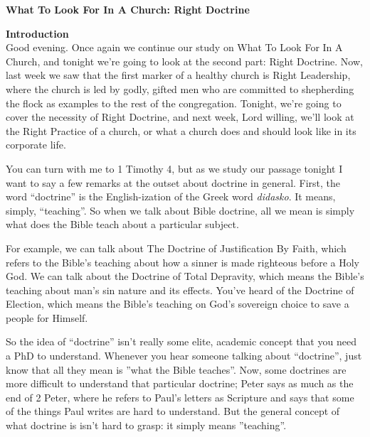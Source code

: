 \documentclass[letterpaper, 12pt]{article}
\begin{document}
    \thispagestyle{empty}

    \begin{center}

        \textbf{\large{What To Look For In A Church: Right Doctrine}}

    \end{center}

    \noindent \textbf{Introduction} \\

    Good evening. Once again we continue our study on What To Look For
    In A Church, and tonight we're going to look at the second part:
    Right Doctrine. Now, last week we saw that the first marker of a
    healthy church is Right Leadership, where the church is led by
    godly, gifted men who are committed to shepherding the flock as
    examples to the rest of the congregation. Tonight, we're going to
    cover the necessity of Right Doctrine, and next week, Lord willing,
    we'll look at the Right Practice of a church, or what a church does
    and should look like in its corporate life.

    You can turn with me to 1 Timothy 4, but as we study our passage
    tonight I want to say a few remarks at the outset about doctrine in
    general. First, the word ``doctrine'' is the English-ization of the
    Greek word \emph{didasko}. It means, simply, ``teaching''. So when
    we talk about Bible doctrine, all we mean is simply what does the
    Bible teach about a particular subject.

    For example, we can talk about The Doctrine of Justification By
    Faith, which refers to the Bible's teaching about how a sinner is
    made righteous before a Holy God. We can talk about the Doctrine of
    Total Depravity, which means the Bible's teaching about man's sin
    nature and its effects. You've heard of the Doctrine of Election,
    which means the Bible's teaching on God's sovereign choice to save a
    people for Himself.

    So the idea of ``doctrine'' isn't really some elite, academic
    concept that you need a PhD to understand. Whenever you hear someone
    talking about ``doctrine'', just know that all they mean is ''what
    the Bible teaches''. Now, some doctrines are more difficult to
    understand that particular doctrine; Peter says as much as the end
    of 2 Peter, where he refers to Paul's letters as Scripture and says
    that some of the things Paul writes are hard to understand. But the
    general concept of what doctrine is isn't hard to grasp: it simply
    means ''teaching''.
\end{document}
